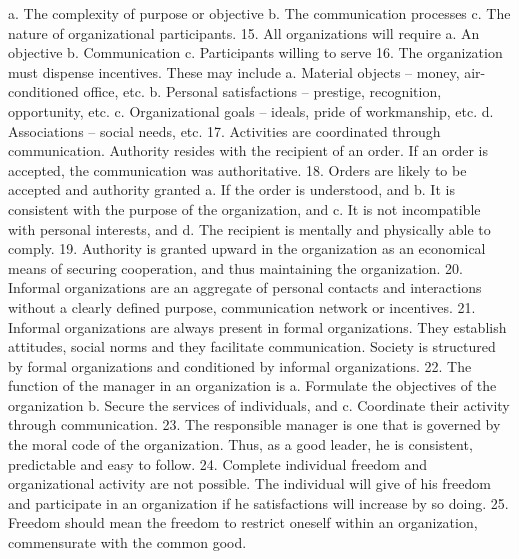         a. The complexity of purpose or objective
        b. The communication processes
        c. The nature of organizational participants.
    15. All organizations will require
        a. An objective
        b. Communication
        c. Participants willing to serve
    16. The organization must dispense incentives. These may include
        a. Material objects – money, air-conditioned office, etc.
        b. Personal satisfactions – prestige, recognition, opportunity, etc.
        c. Organizational goals – ideals, pride of workmanship, etc.
        d. Associations – social needs, etc.
    17. Activities are coordinated through communication. Authority resides with the recipient of an order. If an order is accepted, the communication was authoritative.
    18. Orders are likely to be accepted and authority granted
        a. If the order is understood, and
        b. It is consistent with the purpose of the organization, and
        c. It is not incompatible with personal interests, and
        d. The recipient is mentally and physically able to comply.
    19. Authority is granted upward in the organization as an economical means of securing cooperation, and thus maintaining the organization.
    20. Informal organizations are an aggregate of personal contacts and interactions without a clearly defined purpose, communication network or incentives.
    21. Informal organizations are always present in formal organizations. They establish attitudes, social norms and they facilitate communication. Society is structured by formal organizations and conditioned by informal organizations.
    22. The function of the manager in an organization is
        a. Formulate the objectives of the organization
        b. Secure the services of individuals, and 
        c. Coordinate their activity through communication.
    23. The responsible manager is one that is governed by the moral code of the organization. Thus, as a good leader, he is consistent, predictable and easy to follow.
    24. Complete individual freedom and organizational activity are not possible. The individual will give of his freedom and participate in an organization if he satisfactions will increase by so doing.
    25. Freedom should mean the freedom to restrict oneself within an organization, commensurate with the common good.


